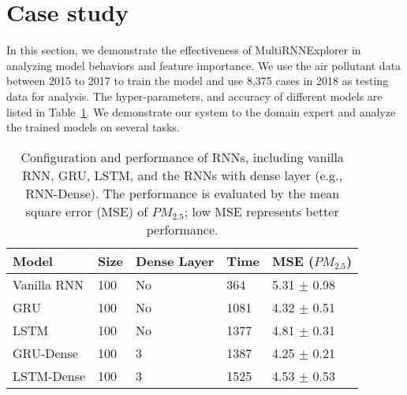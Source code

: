 \section{Case study}

In this section, we demonstrate the effectiveness of MultiRNNExplorer in analyzing model behaviors and feature importance. 
We use the air pollutant data between 2015 to 2017 to train the model and use 8,375 cases in 2018 as testing data for analysis. 
The hyper-parameters,  and accuracy of different models are listed in Table~\ref{table:model_configuration}. 
We demonstrate our system to the domain expert and analyze the trained models on several tasks.

\begin{table}[h!]
\centering
\caption{Configuration and performance of RNNs, including vanilla RNN, GRU, LSTM, and the RNNs with dense layer (e.g., RNN-Dense). The performance is evaluated by the mean square error (MSE) of $PM_{2.5}$; low MSE represents better performance.}
\begin{tabular}{p{1.8cm}|p{0.5cm}|p{1.7cm}|p{0.5cm}|p{1.7cm}} 
 \hline
 Model & Size & Dense Layer & Time & MSE ($PM_{2.5}$) \\ [0.5ex] 
 \hline
    Vanilla RNN&100&No&364&5.31 $\pm$ 0.98 \\
    GRU&100&No&1081&4.32 $\pm$ 0.51\\
    LSTM&100&No&1377&4.81 $\pm$ 0.31\\
    GRU-Dense&100&3&1387&4.25 $\pm$ 0.21\\
    LSTM-Dense&100&3&1525&4.53 $\pm$ 0.53\\
\hline
\end{tabular}
\label{table:model_configuration}
\end{table}















